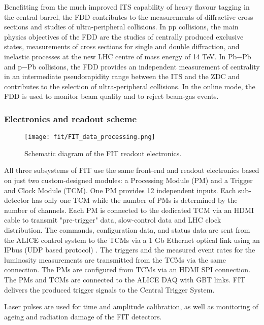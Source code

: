 Benefitting from the much improved ITS capability of heavy flavour tagging in the central barrel, the FDD contributes to the measurements of diffractive cross sections and studies of ultra-peripheral collisions. In pp collisions, the main physics objectives of the FDD are the studies of centrally produced exclusive states, measurements of cross sections for single and double diffraction, and inelastic processes at the new LHC centre of mass energy of 14 TeV. In Pb$-$Pb and p$-$Pb collisions, the FDD provides an independent measurement of centrality in an intermediate pseudorapidity range between the ITS and the ZDC and contributes to the selection of ultra-peripheral collisions. In the online mode, the FDD is used to monitor beam quality and to reject beam-gas events. 


\subsubsection{Electronics and readout scheme}

\begin{figure}[htbp]
\begin{center}
\texttt{[image: fit/FIT\_data\_processing.png]}
\caption{Schematic diagram of the FIT readout electronics. }
\label{default}
\end{center}
\end{figure}
All three subsystems of FIT use the same front-end and readout electronics based on just two custom-designed modules: a Processing Module (PM) and a Trigger and Clock Module (TCM). One PM provides 12 independent inputs. Each sub-detector has only one TCM while the number of PMs is determined by the number of channels. Each PM is connected to the dedicated TCM via an HDMI cable to transmit "pre-trigger" data, slow-control data and LHC clock distribution. The commands, configuration data, and status data are sent from the ALICE control system to the TCMs via a 1 Gb Ethernet optical link using an IPbus (UDP
based protocol) \cite{Finogeev:2020qkf}. The triggers and the measured event rates for the luminosity
measurements are transmitted from the TCMs via the same connection. The PMs are
configured from TCMs via an HDMI SPI connection. The PMs and TCMs are connected
to the ALICE DAQ with GBT links. FIT delivers the produced trigger signals to the Central Trigger System.
 
Laser pulses are used for time and amplitude calibration, as well as monitoring of ageing and radiation damage of the FIT detectors.

